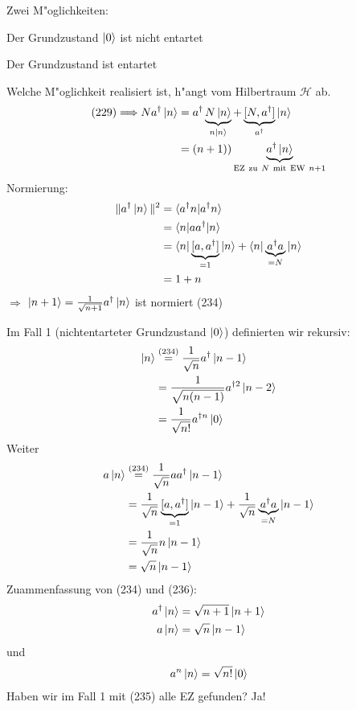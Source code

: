 \documentclass[a4paper]{scrartcl}
\begin{document}
{Zwei M"oglichkeiten:
\begin{1aufz}
\item Der Grundzustand $\ket 0$ ist nicht entartet
\item Der Grundzustand ist entartet
\end{1aufz}
Welche M"oglichkeit realisiert ist, h"angt vom Hilbertraum $\mathcal H$ ab.
\begin{align*}
(229) \Longrightarrow N a^\dagger \ket n & = a^\dagger \underbrace{ N \ket n }_{n \ket n} + \underbrace{ [N, a^\dagger]}_{a^\dagger} \ket n \\
& = (n+1))\underbrace{ a^\dagger \ket n}_{\mathrm{EZ \ zu \ } N \mathrm{ \ mit \ EW \ } n+1}
\end{align*}
Normierung:
\begin{align*}
\Vert a^\dagger \ket n \Vert^2 & = \braket { a^\dagger n | a^\dagger n} \\
&  = \braket { n | a a^\dagger | n } \\
& = \braket{ n | \underbrace{ [ a, a^\dagger]}_{=1} | n } + \braket{ n | \underbrace{ a^\dagger a }_{=N} | n } \\
& = 1+n
\end{align*}
$\Longrightarrow$ $\ket {n+1} = \frac1{\sqrt{n+1}} a^\dagger \ket n $ ist normiert \hfill (234)
\setcounter{equation}{234}

Im Fall 1 (nichtentarteter Grundzustand $\ket 0$) definierten wir rekursiv:
\begin{align}
\begin{split}
\ket n & \stackrel{(234)}= \frac 1 {\sqrt{n}} a^\dagger \ket {n-1} \\
& = \frac 1 {\sqrt{n (n-1)}} a^{\dagger 2} \ket {n-2} \\
& = \frac1 {\sqrt{n!}} a^{\dagger n } \ket 0
\end{split}
\end{align}
Weiter
\begin{align}
\begin{split}
a \ket n & \stackrel{(234)}= \frac 1 {\sqrt n} a a^\dagger \ket{n-1} \\
& = \frac 1{\sqrt n } \underbrace{ [a, a^\dagger]}_{=1} \ket{n-1} + \frac 1 {\sqrt{n}} \underbrace{ a^\dagger a}_{=N} \ket{n-1} \\
& = \frac 1{\sqrt{n}} n \ket{n-1} \\
& = \sqrt n \ket{n-1}
\end{split}
\end{align}
Zuammenfassung von (234) und (236):
\begin{align}
\begin{split}
a^\dagger \ket n & = \sqrt{ n+1} \ket{n+1} \\
a \ket n & = \sqrt n \ket {n-1}
\end{split}
\end{align}
und
\begin{align}
a^n \ket n = \sqrt{n!} \ket 0
\end{align}
Haben wir im Fall 1 mit (235) alle EZ gefunden? Ja!

}
\end{document}
